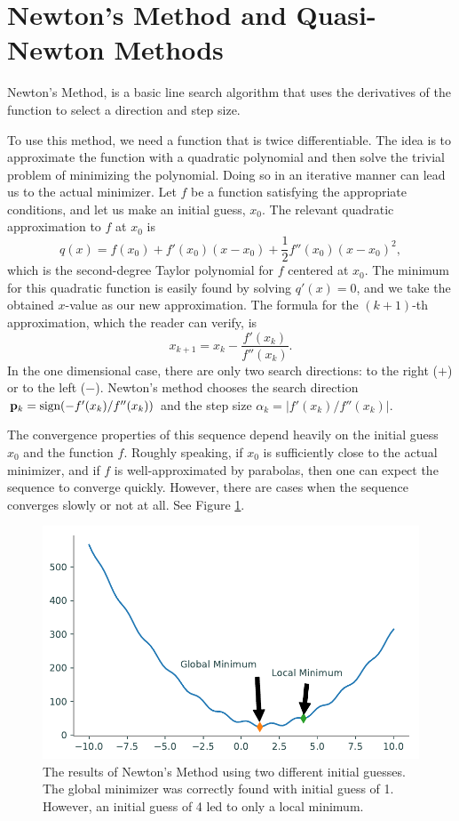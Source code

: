 \section*{Newton's Method and Quasi-Newton Methods} %

Newton's Method, is a basic line search algorithm that uses the derivatives of the function to select a direction and step size.

To use this method, we need a function that is twice differentiable.
The idea is to approximate the function with a quadratic polynomial and then solve the trivial problem of minimizing the polynomial.
Doing so in an iterative manner can lead us to the actual minimizer.
Let $f$ be a function satisfying the appropriate conditions, and let us make an initial guess, $x_0$.
The relevant quadratic approximation to $f$ at $x_0$ is
\begin{equation*}
q(x) = f(x_0) + f'(x_0)(x-x_0) + \frac{1}{2}f''(x_0)(x-x_0)^2,
\end{equation*}
which is the second-degree Taylor polynomial for $f$ centered at $x_0$.
The minimum for this quadratic function is easily found by solving $q'(x) = 0$, and we take the obtained $x$-value as our new approximation.
The formula for the $(k+1)$-th approximation, which the reader can verify, is
\begin{equation*}
x_{k+1} = x_k - \frac{f'(x_k)}{f''(x_k)}.
\end{equation*}
In the one dimensional case, there are only two search directions: to the right ($+$) or to the left ($-$).
Newton's method chooses the search direction $\mathbf{p}_k = \text{sign}(-f'(x_k)/f''(x_k))$ and the step size $\alpha_k = |f'(x_k)/f''(x_k)|$.

The convergence properties of this sequence depend heavily on the initial guess $x_0$ and the function $f$.
Roughly speaking, if $x_0$ is sufficiently close to the actual minimizer, and if $f$ is well-approximated by parabolas, then one can expect the sequence to converge quickly.
However, there are cases when the sequence converges slowly or not at all.
See Figure \ref{linesearch:newton}.

\begin{figure}
\centering
\includegraphics[width=.7\textwidth]{figures/newton.pdf}
\caption{The results of Newton's Method using two different initial guesses.
The global minimizer was correctly found with initial guess of 1.
However, an initial guess of 4 led to only a local minimum.}
\label{linesearch:newton}
\end{figure}

